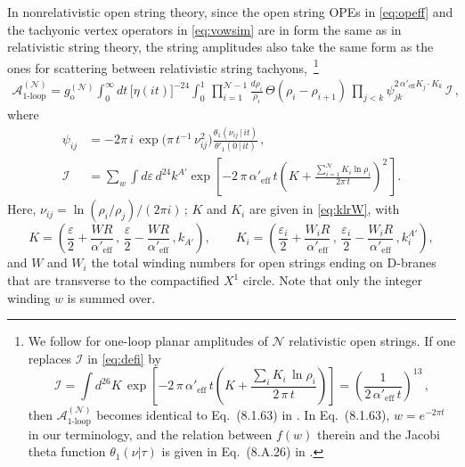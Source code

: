\documentclass[11pt]{article}
\newcommand{\be}{\begin{equation}}
\newcommand{\ee}{\end{equation}}
\newcommand{\CA}{\mathcal{A}}
\newcommand{\CI}{\mathcal{I}}
\newcommand{\CN}{\mathcal{N}}
\newcommand{\lr}{\left (}
\newcommand{\rr}{\right )}
\newcommand{\ls}{\left [}
\newcommand{\rs}{\right ]}
\begin{document}
In nonrelativistic open string theory, since the open string OPEs in \eqref{eq:opeff} and the tachyonic vertex operators in \eqref{eq:vowsim} are in form the same as in relativistic string theory, the string amplitudes also take the same form as the ones for scattering between relativistic string tachyons,~\footnote{We follow \cite{Green:2012pqa} for one-loop planar amplitudes of $\CN$ relativistic open strings. If one replaces $\CI$ in \eqref{eq:defi} by 
%
\be
    \CI = \int d^{26} K \, \exp \! \ls - 2 \, \pi \, \alpha'_\text{eff} \, t \lr K + \frac{\sum_i K_i \, \ln \rho_i}{2 \, \pi \, t} \rr \rs = \lr \frac{1}{2 \, \alpha'_\text{eff} \, t} \rr^{\!13}\,,
\ee
%
then $\CA_\text{1-loop}^{(\CN)}$ becomes identical to Eq.~(8.1.63) in \cite{Green:2012pqa}. In Eq.~(8.1.63), $w = e^{-2\pi t}$ in our terminology, and the relation between $f(w)$ therein and the Jacobi theta function $\theta_1 (\nu|\tau)$ is given in Eq.~(8.A.26) in \cite{Green:2012pqa}.}
%
\begin{align}\label{eq:applanar1loop}
    \CA^{(\CN)}_\text{1-loop} = g_\text{o}^{(\CN)} \int_0^\infty \! dt \, \bigl[ \eta(it) \bigr]^{-24} \int_0^1 \, \prod_{i=1}^{\CN-1} \frac{d\rho_i}{\rho_i} \, \Theta(\rho_i - \rho_{i+1}) \, \prod_{j<k} \psi_{jk}^{2 \, \alpha'_\text{eff} K_j \cdot K_k} \, \CI\,,
\end{align}
%
where
%
\begin{subequations}
\begin{align}
    \psi_{ij} & = -2 \pi \, i \, \exp \bigl( \pi \, t^{-1} \, \nu_{ij}^2 \bigr) \frac{\theta_1 \! \lr \nu_{ij} \, | \, i t \rr}{\theta'_1 \! \lr 0 \, | \, i t \rr}\,, \\[2pt]
    \CI & = \sum_w \int d\varepsilon \, d^{24} k^{A'} \exp \! \ls - 2 \, \pi \, \alpha'_\text{eff} \, t \lr K + \frac{\sum_{i=1}^\CN K_i \ln \rho_i}{2\pi \, t} \rr^{\!\!2\,} \rs. \label{eq:defi}
\end{align}
\end{subequations}
%
Here, $\nu_{ij} = \ln \lr \rho_i / \rho_j \rr / (2\pi i)$\,; $K$ and $K_i$ are given in \eqref{eq:klrW}, with
%
\be \label{eq:kki}
    K = \lr \frac{\varepsilon}{2} + \frac{W R}{\alpha'_\text{eff}}\,,\, \frac{\varepsilon}{2} - \frac{W R}{\alpha'_\text{eff}}\,, k_{A'} \rr,
        \qquad%
    K_i = \lr \frac{\varepsilon_i}{2} + \frac{W_i R}{\alpha'_\text{eff}}\,,\, \frac{\varepsilon_i}{2} - \frac{W_i R}{\alpha'_\text{eff}}\,, k^{A'}_i \rr,
\ee
%
and $W$ and $W_i$ the total winding numbers for open strings ending on D-branes that are transverse to the compactified $X^1$ circle. Note that only the integer winding $w$ is summed over.
\end{document}
